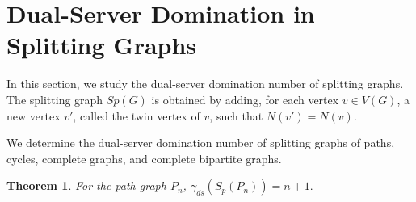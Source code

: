 \documentclass{article}
\newtheorem{theorem}{Theorem}[section]
\begin{document}
\section{Dual-Server Domination in Splitting Graphs}

In this section, we study the dual-server domination number of splitting 
graphs. The splitting graph $Sp(G)$ is obtained by adding, for each vertex 
$v\in V(G)$, a new vertex $v'$, called the twin vertex of $v$, such that $N(v')=N(v).$

We determine the dual-server domination number of splitting graphs of paths, 
cycles, complete graphs, and complete bipartite graphs.

\begin{theorem}\label{SPN}
For the path graph $P_n$, $\gamma_{ds}(S_p(P_n)) = n+1.$
\end{theorem}
\end{document}
